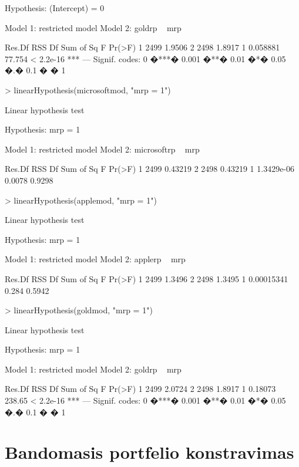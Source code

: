 \documentclass[a4paper]{article}
\begin{document}
\begin{Schunk}
\begin{Soutput}
Hypothesis:
(Intercept) = 0

Model 1: restricted model
Model 2: goldrp ~ mrp

  Res.Df    RSS Df Sum of Sq      F    Pr(>F)    
1   2499 1.9506                                  
2   2498 1.8917  1  0.058881 77.754 < 2.2e-16 ***
---
Signif. codes:  0 �***� 0.001 �**� 0.01 �*� 0.05 �.� 0.1 � � 1 
\end{Soutput}
\begin{Sinput}
> linearHypothesis(microsoftmod, "mrp = 1")
\end{Sinput}
\begin{Soutput}
Linear hypothesis test

Hypothesis:
mrp = 1

Model 1: restricted model
Model 2: microsoftrp ~ mrp

  Res.Df     RSS Df  Sum of Sq      F Pr(>F)
1   2499 0.43219                            
2   2498 0.43219  1 1.3429e-06 0.0078 0.9298
\end{Soutput}
\begin{Sinput}
> linearHypothesis(applemod, "mrp = 1")
\end{Sinput}
\begin{Soutput}
Linear hypothesis test

Hypothesis:
mrp = 1

Model 1: restricted model
Model 2: applerp ~ mrp

  Res.Df    RSS Df  Sum of Sq     F Pr(>F)
1   2499 1.3496                           
2   2498 1.3495  1 0.00015341 0.284 0.5942
\end{Soutput}
\begin{Sinput}
> linearHypothesis(goldmod, "mrp = 1")
\end{Sinput}
\begin{Soutput}
Linear hypothesis test

Hypothesis:
mrp = 1

Model 1: restricted model
Model 2: goldrp ~ mrp

  Res.Df    RSS Df Sum of Sq      F    Pr(>F)    
1   2499 2.0724                                  
2   2498 1.8917  1   0.18073 238.65 < 2.2e-16 ***
---
Signif. codes:  0 �***� 0.001 �**� 0.01 �*� 0.05 �.� 0.1 � � 1 
\end{Soutput}

\section{Bandomasis portfelio konstravimas}


\end{Schunk}
\end{document}
